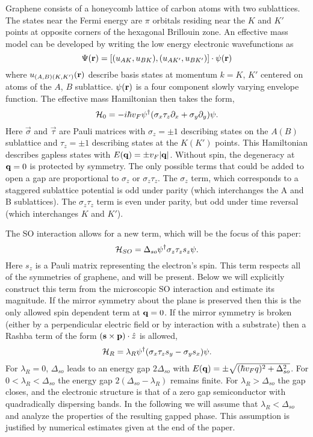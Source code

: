 \documentclass[twocolumn,showpacs,floatfix,prl]{revtex4}
\begin{document}
Graphene consists of a honeycomb lattice
of carbon atoms with two sublattices.  The states near the Fermi
energy are $\pi$ orbitals residing near the $K$
and $K'$ points at opposite corners of the hexagonal Brillouin
zone.  An effective mass model can be developed \cite{ddv} by
writing the low energy electronic wavefunctions as
\begin{equation}
\Psi({\bf r}) =  [(u_{AK}, u_{BK}),(u_{AK'},u_{BK'})]\cdot \psi({\bf r})
\end{equation}
where $u_{(A,B)(K,K')}({\bf r})$ describe basis states at
momentum $k=K$, $K'$ centered on atoms of the $A$, $B$
sublattice. $\psi({\bf r})$ is a four component slowly varying
envelope function.  The effective mass Hamiltonian then takes the
form,
\begin{equation}
{\cal H}_0 = -i\hbar v_F \psi^\dagger(\sigma_x\tau_z\partial_x +
\sigma_y\partial_y)\psi.
\end{equation}
Here $\vec\sigma$ and $\vec\tau$ are Pauli matrices with
$\sigma_z = \pm 1$ describing states on the $A(B)$ sublattice and
$\tau_z = \pm 1$ describing states at the $K(K')$ points.  This
Hamiltonian describes gapless states with $E({\bf q}) = \pm v_F
|{\bf q}|$. Without spin, the degeneracy at ${\bf q}=0$ is
protected by symmetry. The only possible terms that could be
added to open a gap are proportional to $\sigma_z$ or
$\sigma_z\tau_z$.  The $\sigma_z$ term, which corresponds to a
staggered sublattice potential is odd under parity (which
interchanges the A and B sublattices).  The $\sigma_z\tau_z$ term
is even under parity, but odd under time reversal (which
interchanges $K$ and $K'$).

The SO interaction allows for a new term, which will be the focus
of this paper:
\begin{equation}
{\cal H}_{SO} = \Delta_{so} \psi^\dagger \sigma_z\tau_z s_z \psi.
\end{equation}
Here $s_z$ is a Pauli matrix representing the electron's spin.
This term respects all of the symmetries of graphene, and will be
present.  Below we will explicitly construct this term
from the microscopic SO interaction and estimate its magnitude.
If the mirror symmetry about the plane is
preserved then this is the only allowed spin dependent term at ${\bf
q}=0$.  If the mirror symmetry is
broken (either by a perpendicular electric field or by interaction with
a substrate) then a Rashba term\cite{rashba}
 of the form $({\bf s}\times {\bf p})\cdot\hat z$
is allowed,
\begin{equation}
{\cal H}_R = \lambda_R \psi^\dagger (\sigma_x\tau_z s_y - \sigma_y
s_x)\psi.
\end{equation}
For $\lambda_R=0$, $\Delta_{so}$ leads to an energy gap $2\Delta_{so}$ with $E({\bf
q}) = \pm\sqrt{(\hbar v_F q)^2 + \Delta_{so}^2}$.  For
$0<\lambda_R<\Delta_{so}$ the energy gap $2(\Delta_{so}-\lambda_R)$
remains finite.  For $\lambda_R>\Delta_{so}$ the gap closes, and the
electronic structure is that of a zero gap semiconductor with
quadradically dispersing bands.  In the following we will assume that
$\lambda_R<\Delta_{so}$ and analyze the properties of the resulting
gapped phase.  This assumption is justified by numerical estimates
given at the end of the paper.
\end{document}
